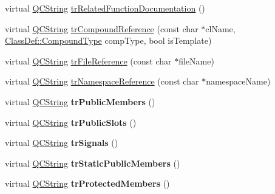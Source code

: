 \begin{DoxyCompactItemize}
\item 
virtual \mbox{\hyperlink{class_q_c_string}{Q\+C\+String}} \mbox{\hyperlink{class_translator_vietnamese_ab33af1547327903b2c38e29ba32e559d}{tr\+Related\+Function\+Documentation}} ()
\item 
virtual \mbox{\hyperlink{class_q_c_string}{Q\+C\+String}} \mbox{\hyperlink{class_translator_vietnamese_a5c7fc89ece1e1200788b4a663fafb6a1}{tr\+Compound\+Reference}} (const char $\ast$cl\+Name, \mbox{\hyperlink{class_class_def_ae70cf86d35fe954a94c566fbcfc87939}{Class\+Def\+::\+Compound\+Type}} comp\+Type, bool is\+Template)
\item 
virtual \mbox{\hyperlink{class_q_c_string}{Q\+C\+String}} \mbox{\hyperlink{class_translator_vietnamese_a7e8bee922dc1908cf7a6fd9daa8cc28e}{tr\+File\+Reference}} (const char $\ast$file\+Name)
\item 
virtual \mbox{\hyperlink{class_q_c_string}{Q\+C\+String}} \mbox{\hyperlink{class_translator_vietnamese_a2f2607ec93d8cf5d9b5e42bf96c655c7}{tr\+Namespace\+Reference}} (const char $\ast$namespace\+Name)
\item 
\mbox{\label{class_translator_vietnamese_ad76c05c852f9f1b2d67834da6733b8f7}} 
virtual \mbox{\hyperlink{class_q_c_string}{Q\+C\+String}} {\bfseries tr\+Public\+Members} ()
\item 
\mbox{\label{class_translator_vietnamese_a00d271f387a1678ab3601a6fd5eeb4ed}} 
virtual \mbox{\hyperlink{class_q_c_string}{Q\+C\+String}} {\bfseries tr\+Public\+Slots} ()
\item 
\mbox{\label{class_translator_vietnamese_a8eaf67481171bd94e8d12fd2c530f3c2}} 
virtual \mbox{\hyperlink{class_q_c_string}{Q\+C\+String}} {\bfseries tr\+Signals} ()
\item 
\mbox{\label{class_translator_vietnamese_a044236ddd8e8cdb9f408b82d18f01a0a}} 
virtual \mbox{\hyperlink{class_q_c_string}{Q\+C\+String}} {\bfseries tr\+Static\+Public\+Members} ()
\item 
\mbox{\label{class_translator_vietnamese_af4df69779f7f80b14dd7e6ae51994f0a}} 
virtual \mbox{\hyperlink{class_q_c_string}{Q\+C\+String}} {\bfseries tr\+Protected\+Members} ()
\item 
\mbox{\label{class_translator_vietnamese_a0995a4b46f9caf8141df655bf78800d8}} 

\end{DoxyCompactItemize}
